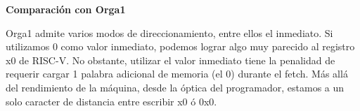 \textbf{Comparación con Orga1}

Orga1 admite varios modos de direccionamiento, entre ellos el inmediato. Si utilizamos 0 como valor inmediato, podemos lograr algo muy parecido al registro x0 de RISC-V. No obstante, utilizar el valor inmediato tiene la penalidad de requerir cargar 1 palabra adicional de memoria (el 0) durante el fetch. Más allá del rendimiento de la máquina, desde la óptica del programador, estamos a un solo caracter de distancia entre escribir x0 ó 0x0.
